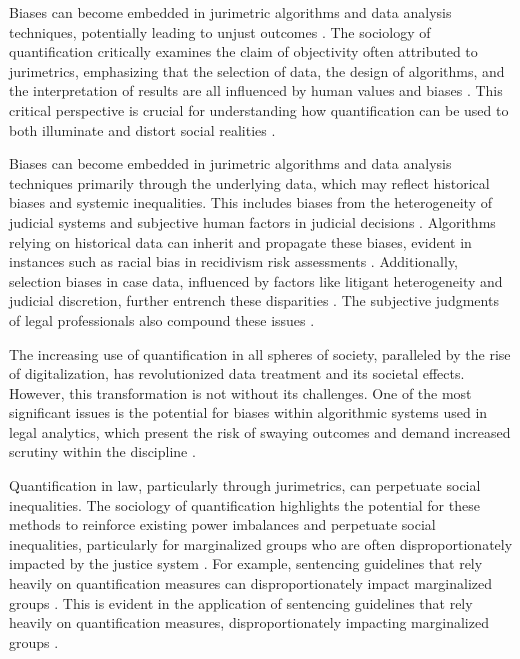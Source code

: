 Biases can become embedded in jurimetric algorithms and data analysis techniques, potentially leading to unjust outcomes \cite{10.1057/s41599-020-00557-0,de2010jurimetrics}. The sociology of quantification critically examines the claim of objectivity often attributed to jurimetrics, emphasizing that the selection of data, the design of algorithms, and the interpretation of results are all influenced by human values and biases \cite{10.1057/s41599-020-00557-0,de2010jurimetrics}. This critical perspective is crucial for understanding how quantification can be used to both illuminate and distort social realities \cite{10.1057/s41599-020-00557-0,de2010jurimetrics}.

Biases can become embedded in jurimetric algorithms and data analysis techniques primarily through the underlying data, which may reflect historical biases and systemic inequalities. This includes biases from the heterogeneity of judicial systems and subjective human factors in judicial decisions \cite{silva2023_pages_10-10,ribeiro1998_pages_5-6}. Algorithms relying on historical data can inherit and propagate these biases, evident in instances such as racial bias in recidivism risk assessments \cite{gillborn2017_pages_3-4}. Additionally, selection biases in case data, influenced by factors like litigant heterogeneity and judicial discretion, further entrench these disparities \cite{ribeiro2021_pages_1-2,nunes2016_pages_103-104}. The subjective judgments of legal professionals also compound these issues \cite{ribeiro2021_pages_8-8}.

The increasing use of quantification in all spheres of society, paralleled by the rise of digitalization, has revolutionized data treatment and its societal effects. However, this transformation is not without its challenges. One of the most significant issues is the potential for biases within algorithmic systems used in legal analytics, which present the risk of swaying outcomes and demand increased scrutiny within the discipline \cite{10.1590/data.2022.65.3.267,loevinger1959}.

Quantification in law, particularly through jurimetrics, can perpetuate social inequalities. The sociology of quantification highlights the potential for these methods to reinforce existing power imbalances and perpetuate social inequalities, particularly for marginalized groups who are often disproportionately impacted by the justice system \cite{10.1590/data.2022.65.3.267,10.32586/rcda.v18i1.585}. For example, sentencing guidelines that rely heavily on quantification measures can disproportionately impact marginalized groups \cite{10.1590/data.2022.65.3.267,10.3390/fi9040068}. This is evident in the application of sentencing guidelines that rely heavily on quantification measures, disproportionately impacting marginalized groups \cite{10.1590/data.2022.65.3.267,10.3390/fi9040068}.

